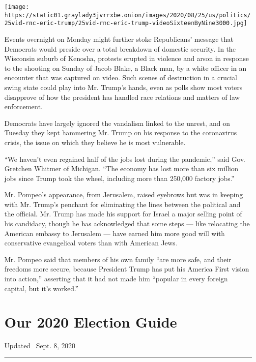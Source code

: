 \texttt{[image: https://static01.graylady3jvrrxbe.onion/images/2020/08/25/us/politics/25vid-rnc-eric-trump/25vid-rnc-eric-trump-videoSixteenByNine3000.jpg]}

Events overnight on Monday might further stoke Republicans' message that
Democrats would preside over a total breakdown of domestic security. In
the Wisconsin suburb of Kenosha, protests erupted in violence and arson
in response to the shooting on Sunday of Jacob Blake, a Black man, by a
white officer in an encounter that was captured on video. Such scenes of
destruction in a crucial swing state could play into Mr. Trump's hands,
even as polls show most voters disapprove of how the president has
handled race relations and matters of law enforcement.

Democrats have largely ignored the vandalism linked to the unrest, and
on Tuesday they kept hammering Mr. Trump on his response to the
coronavirus crisis, the issue on which they believe he is most
vulnerable.

``We haven't even regained half of the jobs lost during the pandemic,''
said Gov. Gretchen Whitmer of Michigan. ``The economy has lost more than
six million jobs since Trump took the wheel, including more than 250,000
factory jobs.''

Mr. Pompeo's appearance, from Jerusalem, raised eyebrows but was in
keeping with Mr. Trump's penchant for eliminating the lines between the
political and the official. Mr. Trump has made his support for Israel a
major selling point of his candidacy, though he has acknowledged that
some steps --- like relocating the American embassy to Jerusalem ---
have earned him more good will with conservative evangelical voters than
with American Jews.

Mr. Pompeo said that members of his own family ``are more safe, and
their freedoms more secure, because President Trump has put his America
First vision into action,'' asserting that it had not made him ``popular
in every foreign capital, but it's worked.''

\hypertarget{our-2020-election-guide}{%
\section{Our 2020 Election Guide}\label{our-2020-election-guide}}

Updated ~Sept. 8, 2020

\begin{center}\rule{0.5\linewidth}{\linethickness}\end{center}

